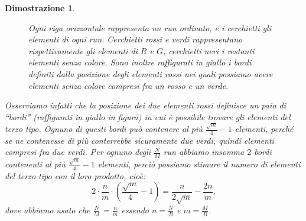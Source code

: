 \documentclass[a4paper, 11pt]{article}
\theoremstyle{plain}
\newtheorem*{proof*}{Dimostrazione}
\begin{document}
\begin{proof*}
\begin{figure}
            \caption{Ogni riga orizzontale rappresenta un run ordinato, e i 
            cerchietti gli elementi di ogni run. Cerchietti rossi e verdi 
            rappresentano rispettivamente gli elementi di \(R\) e \(G\), 
            cerchietti neri i restanti elementi senza colore. Sono inoltre 
            raffigurati in giallo i bordi definiti dalla posizione degli 
            elementi rossi nei quali possiamo avere elementi senza colore 
            compresi fra un rosso e un verde.}
        \end{figure}
        Osserviamo infatti che la posizione dei due elementi rossi definisce
        un paio di ``bordi'' (raffigurati in giallo in figura) in cui \`e
        possibile trovare gli elementi del terzo tipo. Ognuno di questi 
        bordi può contenere al pi\`u \(\frac{\sqrt{m}}{4}-1\) elementi,
        perché se ne contenesse di pi\`u conterrebbe sicuramente due verdi,
        quindi elementi compresi fra due verdi. Per ognuno degli 
        \(\frac{N}{M}\) run abbiamo insomma \(2\) bordi contenenti al pi\`u 
        \(\frac{\sqrt{m}}{4}-1\) elementi, perci\`o possiamo stimare il
        numero di elementi del terzo tipo con il loro prodotto, cio\`e:
        \[
            2 \cdot \frac{n}{m} \cdot \left( \frac{\sqrt{m}}{4}-1 \right) = \frac{n}{2\sqrt{m}} - \frac{2n}{m}\mbox{,}
        \]
        dove abbiamo usato che \(\frac{N}{M}\) = \(\frac{n}{m}\) essendo
        \(n = \frac{N}{B}\) e \(m = \frac{M}{B}\).
        

\end{proof*}
\end{document}
